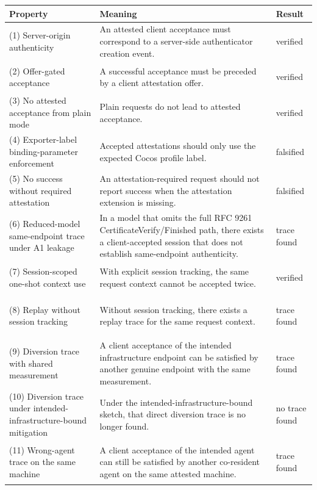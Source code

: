 \documentclass[11pt,a4paper]{article}
\newcommand{\resultverified}{\colorbox{statusgreen}{\strut verified}}
\newcommand{\resultfalsified}{\colorbox{riskred}{\strut falsified}}
\newcommand{\resulttracefound}{\colorbox{riskred}{\strut trace found}}
\newcommand{\resultnotrace}{\colorbox{statusgreen}{\strut no trace found}}
\begin{document}
\begin{table}[H]
\centering
\scriptsize
\begin{tabularx}{\textwidth}{@{}>{\raggedright\arraybackslash}p{}>{\raggedright\arraybackslash}X>{\raggedright\arraybackslash}p{}@{}}
\toprule
\textbf{Property} & \textbf{Meaning} & \textbf{Result} \\
\midrule
(1) Server-origin authenticity & An attested client acceptance must correspond to a server-side authenticator creation event. & \resultverified \\
(2) Offer-gated acceptance & A successful acceptance must be preceded by a client attestation offer. & \resultverified \\
(3) No attested acceptance from plain mode & Plain requests do not lead to attested acceptance. & \resultverified \\
(4) Exporter-label binding-parameter enforcement & Accepted attestations should only use the expected Cocos profile label. & \resultfalsified \\
(5) No success without required attestation & An attestation-required request should not report success when the attestation extension is missing. & \resultfalsified \\
(6) Reduced-model same-endpoint trace under A1 leakage & In a model that omits the full RFC 9261 CertificateVerify/Finished path, there exists a client-accepted session that does not establish same-endpoint authenticity. & \resulttracefound \\
(7) Session-scoped one-shot context use & With explicit session tracking, the same request context cannot be accepted twice. & \resultverified \\
(8) Replay without session tracking & Without session tracking, there exists a replay trace for the same request context. & \resulttracefound \\
(9) Diversion trace with shared measurement & A client acceptance of the intended infrastructure endpoint can be satisfied by another genuine endpoint with the same measurement. & \resulttracefound \\
(10) Diversion trace under intended-infrastructure-bound mitigation & Under the intended-infrastructure-bound sketch, that direct diversion trace is no longer found. & \resultnotrace \\
(11) Wrong-agent trace on the same machine & A client acceptance of the intended agent can still be satisfied by another co-resident agent on the same attested machine. & \resulttracefound \\

\end{tabularx}
\end{table}
\end{document}
